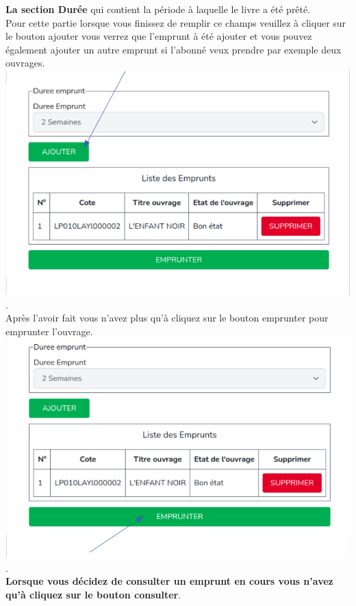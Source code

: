 \documentclass[12pt,a4paper]{article}
\begin{document}
\textbf{La section Durée} qui contient la période à laquelle le livre a été prêté.\\
Pour cette partie lorsque vous finissez de remplir ce champs veuillez à cliquer sur le bouton ajouter vous verrez que l'emprunt à été ajouter et vous pouvez également ajouter un autre emprunt si l'abonné veux prendre par exemple deux ouvrages.\\

\includegraphics[scale=0.5]{images/EDureeAjout.png}.\\
Après l'avoir fait vous n'avez plus qu'à cliquez sur le bouton emprunter pour emprunter l'ouvrage.\\

\includegraphics[scale=0.5]{images/EDureeEmprunt.png}.\\

\textbf{Lorsque vous décidez de consulter un emprunt en cours vous n'avez qu'à cliquez sur le bouton consulter}.\\
\end{document}

